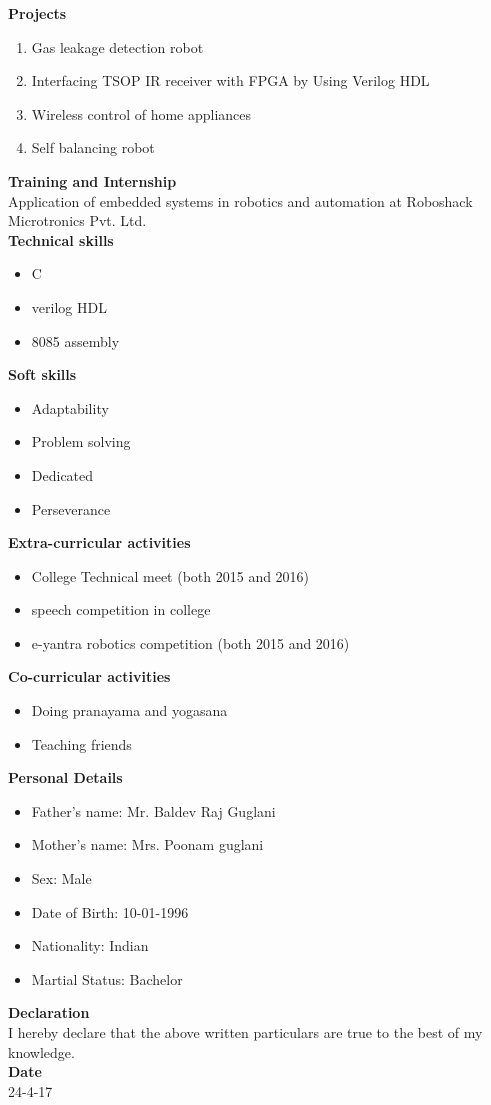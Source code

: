 \documentclass[11pt]{article} %
\begin{document}
\Large{\bf Projects}  
\begin{enumerate}
	\item Gas leakage detection robot
	\item Interfacing TSOP IR receiver with FPGA by Using Verilog HDL
	\item Wireless control of home appliances
	\item Self balancing robot
\end{enumerate}	
\Large{\bf Training and Internship}   \\
Application of embedded systems in robotics and automation at Roboshack Microtronics Pvt. Ltd. \\
\Large{\bf Technical skills}   
\begin{itemize}
	\item C
	\item verilog HDL
	\item 8085 assembly
\end{itemize} 	
\break
\Large{\bf Soft skills}  
\begin{itemize}
	\item Adaptability
	\item Problem solving
	\item Dedicated
	\item Perseverance
\end{itemize}
\Large{\bf Extra-curricular activities}  
\begin{itemize}
	\item College Technical meet (both 2015 and 2016)
	\item speech competition in college
	\item e-yantra robotics competition (both 2015 and 2016)
\end{itemize}
\Large{\bf Co-curricular activities}  
\begin{itemize}
	\item Doing pranayama and yogasana
	\item Teaching friends
\end{itemize}
\Large{\bf Personal Details}  
\begin{itemize}
	\item Father's name: Mr. Baldev Raj Guglani
	\item Mother's name: Mrs. Poonam guglani
	\item Sex: Male
	\item Date of Birth: 10-01-1996
	\item Nationality: Indian
	\item Martial Status: Bachelor
\end{itemize}
\Large{\bf Declaration} \\
I hereby declare that the above written particulars are true to the best of my knowledge.	\\
\Large{\bf Date} \\
24-4-17
\end{document}
